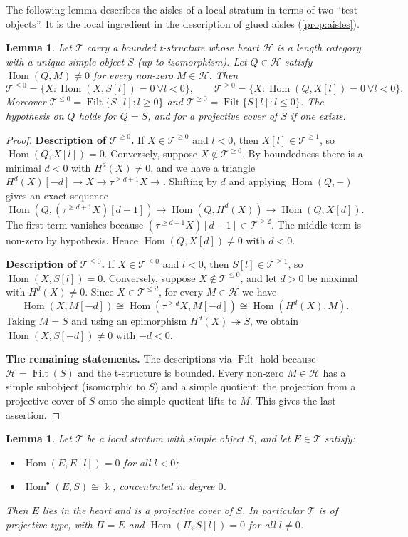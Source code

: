 \documentclass[11pt,reqno]{amsart}
\theoremstyle{plain}
\newtheorem{lemma}[theorem]{Lemma}
\theoremstyle{definition}
\theoremstyle{remark}
\newcommand{\kk}{\Bbbk}
\DeclareMathOperator{\Hom}{Hom}
\DeclareMathOperator{\Filt}{Filt}
\newcommand{\cH}{\mathcal{H}}
\newcommand{\cT}{\mathcal{T}}
\begin{document}
The following lemma describes the aisles of a local stratum in terms of two ``test objects''. It is the local ingredient in the description of glued aisles (\cref{prop:aisles}).


\begin{lemma}\label{lem:aisles}
Let $\cT$ carry a bounded t-structure whose heart $\cH$ is a length category with a unique simple object $S$ (up to isomorphism). Let $Q\in\cH$ satisfy $\Hom(Q,M)\ne0$ for every non-zero $M\in\cH$. Then
\[\cT^{\le0}=\{X:\Hom(X,S[l])=0\ \forall l<0\},\qquad\cT^{\ge0}=\{X:\Hom(Q,X[l])=0\ \forall l<0\}.\]
Moreover $\cT^{\le0}=\Filt\{S[l]:l\ge0\}$ and $\cT^{\ge0}=\Filt\{S[l]:l\le0\}$. The hypothesis on $Q$ holds for $Q=S$, and for a projective cover of $S$ if one exists.
\end{lemma}

\begin{proof}
\textbf{Description of $\cT^{\ge0}$.} If $X\in\cT^{\ge0}$ and $l<0$, then $X[l]\in\cT^{\ge1}$, so $\Hom(Q,X[l])=0$. Conversely, suppose $X\notin\cT^{\ge0}$. By boundedness there is a minimal $d<0$ with $H^d(X)\ne0$, and we have a triangle $H^d(X)[-d]\to X\to\tau^{\ge d+1}X\to$. Shifting by $d$ and applying $\Hom(Q,-)$ gives an exact sequence
\[\Hom(Q,(\tau^{\ge d+1}X)[d-1])\to\Hom(Q,H^d(X))\to\Hom(Q,X[d]).\]
The first term vanishes because $(\tau^{\ge d+1}X)[d-1]\in\cT^{\ge2}$. The middle term is non-zero by hypothesis. Hence $\Hom(Q,X[d])\ne0$ with $d<0$.

\textbf{Description of $\cT^{\le0}$.} If $X\in\cT^{\le0}$ and $l<0$, then $S[l]\in\cT^{\ge1}$, so $\Hom(X,S[l])=0$. Conversely, suppose $X\notin\cT^{\le0}$, and let $d>0$ be maximal with $H^d(X)\ne0$. Since $X\in\cT^{\le d}$, for every $M\in\cH$ we have
\[\Hom(X,M[-d])\cong\Hom(\tau^{\ge d}X,M[-d])\cong\Hom(H^d(X),M).\]
Taking $M=S$ and using an epimorphism $H^d(X)\twoheadrightarrow S$, we obtain $\Hom(X,S[-d])\ne0$ with $-d<0$.

\textbf{The remaining statements.} The descriptions via $\Filt$ hold because $\cH=\Filt(S)$ and the t-structure is bounded. Every non-zero $M\in\cH$ has a simple subobject (isomorphic to $S$) and a simple quotient; the projection from a projective cover of $S$ onto the simple quotient lifts to $M$. This gives the last assertion.
\end{proof}

\begin{lemma}\label{lem:recognise-proj}
Let $\cT$ be a local stratum with simple object $S$, and let $E\in\cT$ satisfy:
\begin{itemize}
\item $\Hom(E,E[l])=0$ for all $l<0$;
\item $\Hom^\bullet(E,S)\cong\kk$, concentrated in degree $0$.
\end{itemize}
Then $E$ lies in the heart and is a projective cover of $S$. In particular $\cT$ is of projective type, with $\Pi=E$ and $\Hom(\Pi,S[l])=0$ for all $l\ne0$.
\end{lemma}
\end{document}
